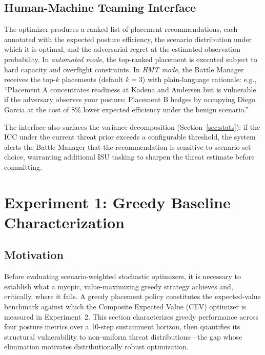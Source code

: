 \documentclass[11pt]{article}
\begin{document}
\subsection{Human-Machine Teaming Interface}
\label{sec:approach:hmt}

The optimizer produces a ranked list of placement recommendations,
each annotated with the expected posture efficiency, the scenario
distribution under which it is optimal, and the adversarial regret at
the estimated observation probability. In \emph{automated mode}, the
top-ranked placement is executed subject to hard capacity and overflight
constraints. In \emph{HMT mode}, the Battle Manager receives the top-$k$
placements (default $k = 3$) with plain-language rationale:
e.g., ``Placement A concentrates readiness at Kadena and Andersen but
is vulnerable if the adversary observes your posture; Placement B
hedges by occupying Diego Garcia at the cost of 8\% lower expected
efficiency under the benign scenario.''

The interface also surfaces the variance decomposition
(Section~\ref{sec:stats}): if the ICC under the current threat prior
exceeds a configurable threshold, the system alerts the Battle Manager
that the recommendation is sensitive to scenario-set choice, warranting
additional ISU tasking to sharpen the threat estimate before committing.


\section{Experiment 1: Greedy Baseline Characterization}
\label{sec:exp1}

\subsection{Motivation}

Before evaluating scenario-weighted stochastic optimizers, it is necessary
to establish what a myopic, value-maximizing greedy strategy achieves and,
critically, where it fails. A greedy placement policy constitutes the
expected-value benchmark against which the Composite Expected Value (CEV)
optimizer is measured in Experiment~2. This section characterizes greedy
performance across four posture metrics over a 10-step sustainment horizon,
then quantifies its structural vulnerability to non-uniform threat
distributions---the gap whose elimination motivates distributionally robust
optimization.
\end{document}
